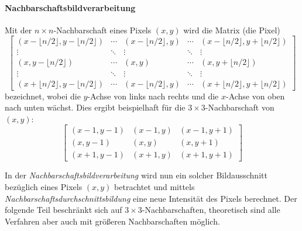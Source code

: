 				\paragraph{Nachbarschaftsbildverarbeitung}
					Mit der \( n \times n \)-Nachbarschaft eines Pixels \( (x, y) \) wird die Matrix (\bzw die Pixel)
					\begin{equation*}
						\begin{bmatrix}
							(x - \lfloor n/2 \rfloor, y - \lfloor n/2 \rfloor) & \cdots & (x - \lfloor n/2 \rfloor, y) & \cdots & (x - \lfloor n/2 \rfloor, y + \lfloor n/2 \rfloor) \\
							\vdots                                             & \ddots & \vdots                       & \ddots & \vdots                                             \\
							(x, y - \lfloor n/2 \rfloor)                       & \cdots & (x, y)                       & \cdots & (x, y + \lfloor n/2 \rfloor)                       \\
							\vdots                                             & \ddots & \vdots                       & \ddots & \vdots                                             \\
							(x + \lfloor n/2 \rfloor, y - \lfloor n/2 \rfloor) & \cdots & (x - \lfloor n/2 \rfloor, y) & \cdots & (x + \lfloor n/2 \rfloor, y + \lfloor n/2 \rfloor)
						\end{bmatrix}
					\end{equation*}
					bezeichnet, wobei die \(y\)-Achse von links nach rechts und die \(x\)-Achse von oben nach unten wächst. Dies ergibt beispielhaft für die \( 3 \times 3 \)-Nachbarschaft von \( (x, y) \):
					\begin{equation*}
						\begin{bmatrix}
							(x - 1, y - 1) & (x - 1, y) & (x - 1, y + 1) \\
							(x, y - 1)     & (x, y)     & (x, y + 1)     \\
							(x + 1, y - 1) & (x + 1, y) & (x + 1, y + 1)
						\end{bmatrix}
					\end{equation*}
					
					In der \emph{Nachbarschaftsbildverarbeitung} wird nun ein solcher Bildausschnitt bezüglich eines Pixels \( (x, y) \) betrachtet und \zB mittels \emph{Nachbarschaftsdurchschnittsbildung} eine neue Intensität des Pixels berechnet. Der folgende Teil beschränkt sich auf \( 3 \times 3 \)-Nachbarschaften, theoretisch sind alle Verfahren aber auch mit größeren Nachbarschaften möglich.
					
